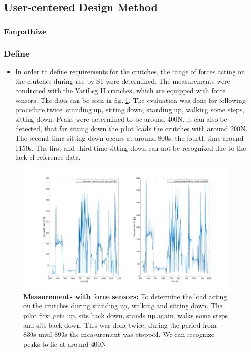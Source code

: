 
\subsection{User-centered Design Method}
\subsubsection{Empathize}
\label{subsec:empathize}
\subsubsection{Define}
\label{subsec:define}

\begin{itemize}
    \item In order to define requirements for the crutches, the range of forces acting on the crutches during use by S1 were determined. The measurements were conducted with the VariLeg II crutches, which are equipped with force sensors. The data can be seen in fig. \ref{fig:forcesensordata}. The evaluation was done for following procedure twice: standing up, sitting down, standing up, walking some steps, sitting down. Peaks were determined to be around 400N. It can also be detected, that for sitting down the pilot loads the crutches with around 200N. The second time sitting down occurs at around 800s, the fourth time around 1150s. The first and third time sitting down can not be recognized due to the lack of reference data. 
\end{itemize}


\begin{figure}
    \centering
    \includegraphics[width=1.8\columnwidth]{Appendix/ergonomic_crutch/forcesensordata.png}
    \onecolumn
    \caption[width=2\columnwidth]{\textbf{Measurements with force sensors:} To determine the load acting on the crutches during standing up, walking and sitting down. The pilot first gets up, sits back down, stands up again, walks some steps and sits back down. This was done twice, during the period from 830s until 890s the measurement was stopped. We can recognize peaks to lie at around 400N}
    \twocolumn
    \label{fig:forcesensordata}
\end{figure}


